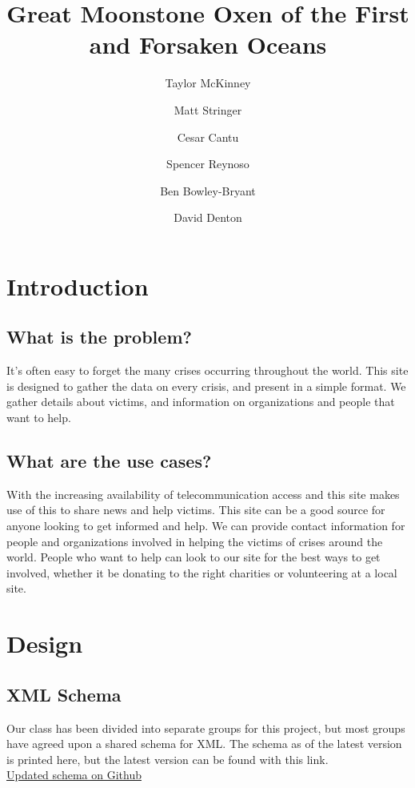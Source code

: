 \documentclass[12pt]{report}
\title{Great Moonstone Oxen of the First and Forsaken Oceans}
\author{
    Taylor McKinney
    \and Matt Stringer
    \and Cesar Cantu
    \and Spencer Reynoso
    \and Ben Bowley-Bryant
    \and David Denton}
\begin{document}
\maketitle

\section*{Introduction}
\subsection*{What is the problem?}
\hfill


It's often easy to forget the many crises occurring throughout the world.
This site is designed to gather the data on every crisis, and present in a simple format.
We gather details about victims, and information on organizations and people that want to help.

\subsection*{What are the use cases?}
\hfill


With the increasing availability of telecommunication access and this site makes use of this to share news and help victims.
This site can be a good source for anyone looking to get informed and help. 
We can provide contact information for people and organizations involved in helping the victims of crises around the world.
People who want to help can look to our site for the best ways to get involved, whether it be donating to the right charities or volunteering at a local site.

\newpage
\section*{Design}
\subsection*{XML Schema}
\hfill


Our class has been divided into separate groups for this project, but most groups have agreed upon a shared schema for XML.
The schema as of the latest version is printed here, but the latest version can be found with this link.\\


\href{https://github.com/aaronj1335/cs373-wcdb1-schema/blob/master/WorldCrises.xsd.xml}{Updated schema on Github}\\
\end{document}

